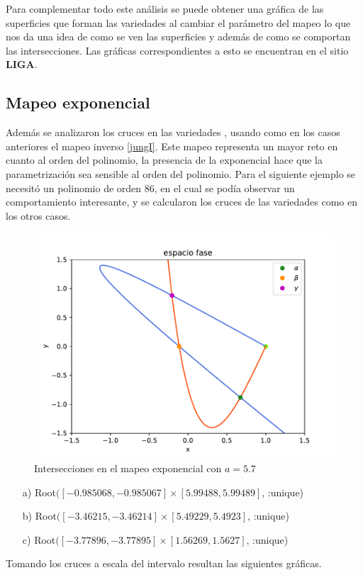 Para complementar todo este análisis se puede obtener una gráfica de las superficies que forman las variedades al cambiar el parámetro del mapeo lo que nos da una idea de como se ven las superficies y además de como se comportan las intersecciones. Las gráficas correspondientes a esto se encuentran en el sitio \textbf{LIGA}.
\subsection{Mapeo exponencial}
Además se analizaron los cruces en las variedades , usando como en los casos anteriores el mapeo inverso \ref{jungI}. Este mapeo representa un mayor reto en cuanto al orden del polinomio, la presencia de la exponencial hace que la parametrización sea sensible al orden del polinomio. Para el siguiente ejemplo se necesitó un polinomio de orden 86, en el cual se podía observar un comportamiento interesante, y se calcularon los cruces de las variedades como en los otros casos. 



\begin{figure}[H]
\centering
\includegraphics[scale=0.5]{cruces_jung1}
\caption{Intersecciones en el mapeo exponencial con $a=5.7$}
\label{jung_cortes}
\end{figure}
\begin{itemize}
\item[a)] Root$([-0.985068, -0.985067] \times [5.99488, 5.99489]$, :unique)
\item[b)] Root$([-3.46215, -3.46214] \times [5.49229, 5.4923]$, :unique)
\item[c)] Root$([-3.77896, -3.77895] \times [1.56269, 1.5627]$, :unique)
\end{itemize}
Tomando los cruces a escala del intervalo resultan las siguientes gráficas.

